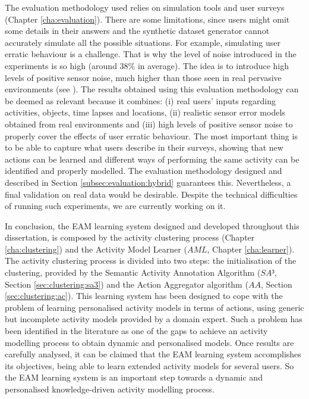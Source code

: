 The evaluation methodology used relies on simulation tools and user surveys (Chapter \ref{cha:evaluation}). There are some limitations, since users might omit some details in their answers and the synthetic dataset generator cannot accurately simulate all the possible situations. For example, simulating user erratic behaviour is a challenge. That is why the level of noise introduced in the experiments is so high (around 38\% in average). The idea is to introduce high levels of positive sensor noise, much higher than those seen in real pervasive environments (see \cite{Chen2012}). The results obtained using this evaluation methodology can be deemed as relevant because it combines: (i) real users' inputs regarding activities, objects, time lapses and locations, (ii) realistic sensor error models obtained from real environments and (iii) high levels of positive sensor noise to properly cover the effects of user erratic behaviour. The most important thing is to be able to capture what users describe in their surveys, showing that new actions can be learned and different ways of performing the same activity can be identified and properly modelled. The evaluation methodology designed and described in Section \ref{subsec:evaluation:hybrid} guarantees this. Nevertheless, a final validation on real data would be desirable. Despite the technical difficulties of running such experiments, we are currently working on it.

In conclusion, the EAM learning system designed and developed throughout this dissertation, is composed by the activity clustering process (Chapter \ref{cha:clustering}) and the Activity Model Learner ($AML$, Chapter \ref{cha:learner}). The activity clustering process is divided into two steps: the initialisation of the clustering, provided by the Semantic Activity Annotation Algorithm ($SA³$, Section \ref{sec:clustering:sa3}) and the Action Aggregator algorithm ($AA$, Section \ref{sec:clustering:ac}). This learning system has been designed to cope with the problem of learning personalised activity models in terms of actions, using generic but incomplete activity models provided by a domain expert. Such a problem has been identified in the literature as one of the gaps to achieve an activity modelling process to obtain dynamic and personalised models. Once results are carefully analysed, it can be claimed that the EAM learning system accomplishes its objectives, being able to learn extended activity models for several users. So the EAM learning system is an important step towards a dynamic and personalised knowledge-driven activity modelling process. 